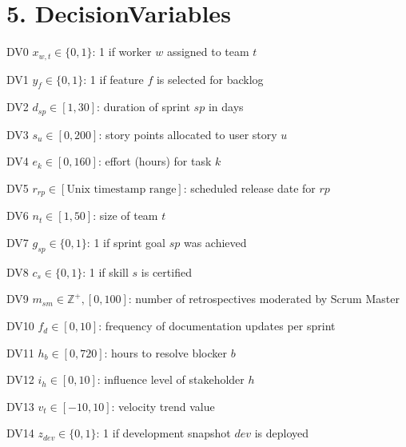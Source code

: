 \documentclass[12pt]{article}
\begin{document}
\section{5. DecisionVariables}
\item[DV0] $x_{w,t} \in \{0,1\}$: 1 if worker $w$ assigned to team $t$
    \item[DV1] $y_f \in \{0,1\}$: 1 if feature $f$ is selected for backlog
    \item[DV2] $d_{sp} \in [1,30]$: duration of sprint $sp$ in days
    \item[DV3] $s_u \in [0,200]$: story points allocated to user story $u$
    \item[DV4] $e_k \in [0,160]$: effort (hours) for task $k$
    \item[DV5] $r_{rp} \in [\text{Unix timestamp range}]$: scheduled release date for $rp$
    \item[DV6] $n_t \in [1,50]$: size of team $t$
    \item[DV7] $g_{sp} \in \{0,1\}$: 1 if sprint goal $sp$ was achieved
    \item[DV8] $c_s \in \{0,1\}$: 1 if skill $s$ is certified
    \item[DV9] $m_{sm} \in \mathbb{Z}^+, [0,100]$: number of retrospectives moderated by Scrum Master
    \item[DV10] $f_d \in [0,10]$: frequency of documentation updates per sprint
    \item[DV11] $h_b \in [0,720]$: hours to resolve blocker $b$
    \item[DV12] $i_h \in [0,10]$: influence level of stakeholder $h$
    \item[DV13] $v_t \in [-10,10]$: velocity trend value
    \item[DV14] $z_{dev} \in \{0,1\}$: 1 if development snapshot $dev$ is deployed
\end{document}
